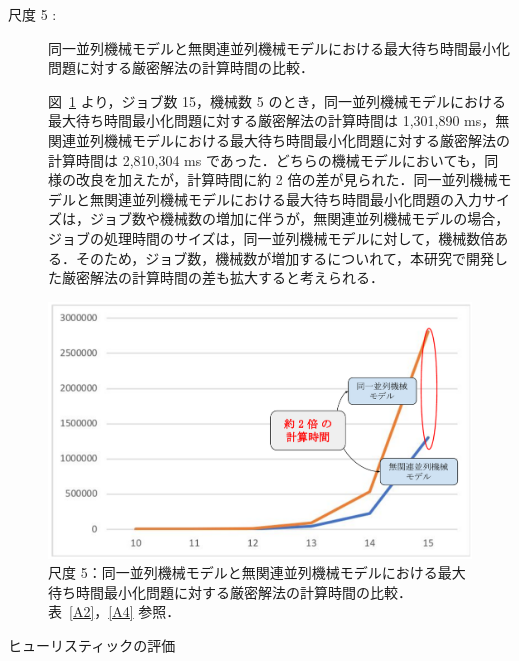 \documentclass[12pt]{optlab-bachelor}
\begin{document}
\newpage
\begin{description}
  \item[尺度 5 :] 同一並列機械モデルと無関連並列機械モデルにおける最大待ち時間最小化問題に対する厳密解法の計算時間の比較．

  図~\ref{5.5} より，ジョブ数 15，機械数 5 のとき，同一並列機械モデルにおける最大待ち時間最小化問題に対する厳密解法の計算時間は 1,301,890 ms，無関連並列機械モデルにおける最大待ち時間最小化問題に対する厳密解法の計算時間は 2,810,304 ms であった．どちらの機械モデルにおいても，同様の改良を加えたが，計算時間に約 2 倍の差が見られた．同一並列機械モデルと無関連並列機械モデルにおける最大待ち時間最小化問題の入力サイズは，ジョブ数や機械数の増加に伴うが，無関連並列機械モデルの場合，ジョブの処理時間のサイズは，同一並列機械モデルに対して，機械数倍ある．そのため，ジョブ数，機械数が増加するについれて，本研究で開発した厳密解法の計算時間の差も拡大すると考えられる．
\end{description}
\begin{figure}[ht]
  \centering
  \includegraphics[width = 14cm]{figure/modelTimeComparison.pdf}
  \caption{尺度 5：同一並列機械モデルと無関連並列機械モデルにおける最大待ち時間最小化問題に対する厳密解法の計算時間の比較．表~\ref{A2}，\ref{A4} 参照．}
  \label{5.5}
\end{figure}

\newpage
\begin{description}
  \item[ヒューリスティックの評価] ~
\end{description}
\end{document}
